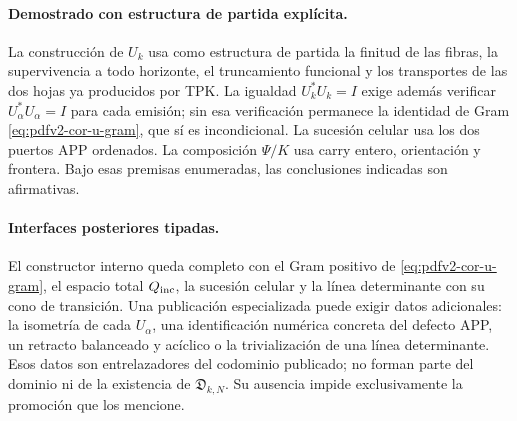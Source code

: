 \paragraph{Demostrado con estructura de partida explícita.}
La construcción de \(U_k\) usa como estructura de partida la finitud de las
fibras, la supervivencia a todo horizonte, el truncamiento funcional y los
transportes de las dos hojas ya producidos por TPK\@. La igualdad
\(U_k^*U_k=I\) exige además verificar \(U_\alpha^*U_\alpha=I\) para cada
emisión; sin esa verificación permanece la identidad de Gram
\eqref{eq:pdfv2-cor-u-gram}, que sí es incondicional. La sucesión celular usa
los dos puertos APP ordenados. La composición \(\Psi/K\) usa carry entero,
orientación y frontera. Bajo esas premisas enumeradas, las conclusiones
indicadas son afirmativas.

\paragraph{Interfaces posteriores tipadas.}
El constructor interno queda completo con el Gram positivo de
\eqref{eq:pdfv2-cor-u-gram}, el espacio total \(Q_{\rm inc}\), la sucesión
celular y la línea determinante con su cono de transición. Una publicación
especializada puede exigir datos adicionales: la isometría de cada
\(U_\alpha\), una identificación numérica concreta del defecto APP, un
retracto balanceado y acíclico o la trivialización de una línea
determinante. Esos datos son entrelazadores del codominio publicado; no
forman parte del dominio ni de la existencia de
\(\mathfrak D_{k,N}\). Su ausencia impide exclusivamente la promoción que
los mencione.

